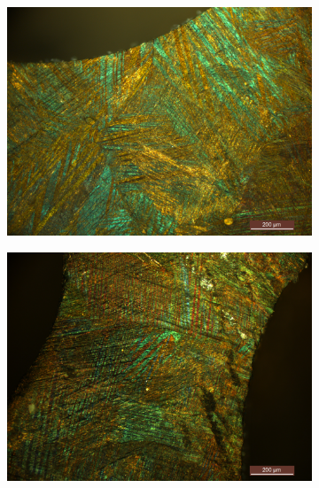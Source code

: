 \documentclass[a4paper,12pt,fleqn,twoside,openany]{book}
\begin{document}
 \begin{figure}[h]
 \centering
    \begin{subfigure}{0.45\textwidth}
        \includegraphics[width=\textwidth]{Img/Introduccion/EspAMicro5.jpg}
        \caption{}
        \label{fig:EspAMicro5}
    \end{subfigure}
 \begin{subfigure}{0.45\textwidth}
        \includegraphics[width=\textwidth]{Img/Introduccion/EspAMicro1.jpg}
        \caption{}
        \label{fig:EspAMicro1}
    \end{subfigure}
    \begin{subfigure}{0.45\textwidth}

\end{subfigure}
\end{figure}
\end{document}
